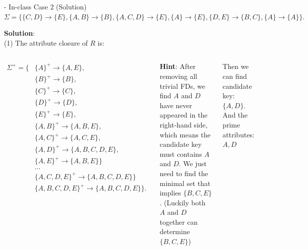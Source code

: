 \begin{frame}[fragile]{ - In-class Case 2 (Solution)}
	$\Sigma=\{\{C,D\} \rightarrow \{E\},\{A,B\} \rightarrow \{B\}, \{A,C,D\} \rightarrow \{E\},\{A\} \rightarrow \{E\},\{D,E\} \rightarrow \{B,C\},\{A\} \rightarrow \{A\}\}.$\\\vspace{5pt}
	
	\textbf{Solution}:\\
	(1) The attribute closure of $R$ is:
	\vspace{-10pt}\begin{columns}
	\begin{scriptsize}\begin{align*} 
		\Sigma^{+} = \{&\{A\}^{+} \rightarrow \{A,E\},\\
		&\{B\}^{+} \rightarrow \{B\},\\
		&\{C\}^{+} \rightarrow \{C\},\\
		&\{D\}^{+} \rightarrow \{D\},\\
		&\{E\}^{+} \rightarrow \{E\},\\
		&\{A,B\}^{+} \rightarrow \{A,B,E\},\\
		&\{A,C\}^{+} \rightarrow \{A,C,E\},\\
		&\{A,D\}^{+} \rightarrow \{A,B,C,D,E\},\\
		&\{A,E\}^{+} \rightarrow \{A,B,E\}\}\\
		& ...\\
		&\{A,C,D,E\}^{+} \rightarrow \{A,B,C,D,E\}\}\\
		&\{A,B,C,D,E\}^{+} \rightarrow \{A,B,C,D,E\}\}.
	\end{align*}\end{scriptsize} 
	
	\textbf{Hint}: 
	After removing all trivial FDs, we find $A$ and $D$ have never appeared in the right-hand side, which means the candidate key must contains $A$ and $D$. We just need to find the minimal set that implies $\{B,C,E\}$. (Luckily both $A$ and $D$ together can determine $\{B,C,E\}$)\\\vspace{3pt}

	Then we can find candidate key: $\{A,D\}$. And the prime attributes: $A, D$
	\end{columns}
	
\end{frame}

